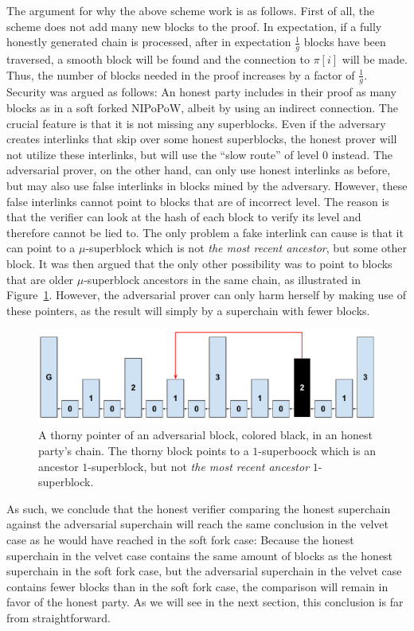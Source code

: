 The argument for why the above scheme work is as follows. First of all, the
scheme does not add many new blocks to the proof. In expectation, if a fully
honestly generated chain is processed, after in expectation $\frac{1}{g}$ blocks
have been traversed, a smooth block will be found and the connection to $\pi[i]$
will be made. Thus, the number of blocks needed in the proof increases by a
factor of $\frac{1}{g}$. Security was argued as follows: An honest party
includes in their proof as many blocks as in a soft forked NIPoPoW, albeit by
using an indirect connection. The crucial feature is that it is not missing any
superblocks. Even if the adversary creates interlinks that skip over some honest
superblocks, the honest prover will not utilize these interlinks, but will use
the ``slow route'' of level $0$ instead. The adversarial prover, on the other
hand, can only use honest interlinks as before, but may also use false
interlinks in blocks mined by the adversary. However, these false
interlinks cannot point to blocks that are of incorrect level. The reason is
that the verifier can look at the hash of each block to verify its level and
therefore cannot be lied to. The only problem a fake interlink can cause is that
it can point to a $\mu$-superblock which is not \emph{the most recent ancestor},
but some other block. It was then argued that the only other possibility was
to point to blocks that are older $\mu$-superblock ancestors in the same chain,
as illustrated in Figure~\ref{fig:skip_ancestor}. However, the adversarial
prover can only harm herself by making use of these pointers, as the result will
simply by a superchain with fewer blocks.

\begin{figure}[h]
	\begin{center}
		\includegraphics[width=0.9\columnwidth]{figures/simple_thorny.pdf}
	\end{center}
    \caption{A thorny pointer of an adversarial block, colored black, in an honest party's chain. The thorny block points to a $1$-superboock which is an ancestor
		$1$-superblock, but not \emph{the most recent ancestor} $1$-superblock.}
	\label{fig:skip_ancestor}
\end{figure}

As such, we conclude that the honest verifier comparing the honest superchain
against the adversarial superchain will reach the same conclusion in the velvet
case as he would have reached in the soft fork case: Because the honest
superchain in the velvet case contains the same amount of blocks as the honest
superchain in the soft fork case, but the adversarial superchain in the velvet
case contains fewer blocks than in the soft fork case, the comparison will
remain in favor of the honest party. As we will see in the next section, this
conclusion is far from straightforward.
